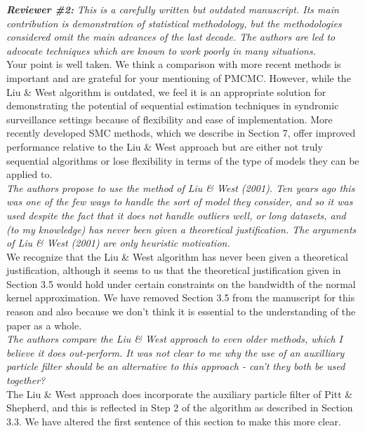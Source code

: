 \documentclass{article}
\begin{document}
\noindent \emph{{\bf Reviewer \#2:} This is a carefully written but outdated manuscript. Its main contribution is demonstration of statistical methodology, but the methodologies considered omit the main advances of the last decade. The authors are led to advocate techniques which are known to work poorly in many situations.} \\

Your point is well taken. We think a comparison with more recent methods is important and are grateful for your mentioning of PMCMC. However, while the Liu \& West algorithm is outdated, we feel it is an appropriate solution for demonstrating the potential of sequential estimation techniques in syndromic surveillance settings because of flexibility and ease of implementation. More recently developed SMC methods, which we describe in Section 7, offer improved performance relative to the Liu \& West approach but are either not truly sequential algorithms or lose flexibility in terms of the type of models they can be applied to. \\

\noindent \emph{The authors propose to use the method of Liu \& West (2001). Ten years ago this was one of the few ways to handle the sort of model they consider, and so it was used despite the fact that it does not handle outliers well, or long datasets, and (to my knowledge) has never been given a theoretical justification. The arguments of Liu \& West (2001) are only heuristic motivation.} \\

We recognize that the Liu \& West algorithm has never been given a theoretical justification, although it seems to us that the theoretical justification given in Section 3.5 would hold under certain constraints on the bandwidth of the normal kernel approximation. We have removed Section 3.5 from the manuscript for this reason and also because we don't think it is essential to the understanding of the paper as a whole. \\

\noindent \emph{The authors compare the Liu \& West approach to even older methods, which I believe it does out-perform. It was not clear to me why the use of an auxilliary particle filter should be an alternative to this approach - can't they both be used together?} \\

The Liu \& West approach does incorporate the auxiliary particle filter of Pitt \& Shepherd, and this is reflected in Step 2 of the algorithm as described in Section 3.3. We have altered the first sentence of this section to make this more clear. \\
\end{document}
